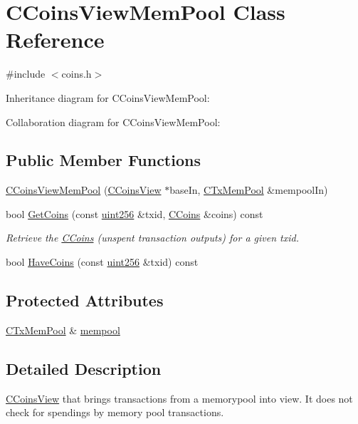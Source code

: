 \hypertarget{class_c_coins_view_mem_pool}{}\section{C\+Coins\+View\+Mem\+Pool Class Reference}
\label{class_c_coins_view_mem_pool}


{\ttfamily \#include $<$coins.\+h$>$}



Inheritance diagram for C\+Coins\+View\+Mem\+Pool\+:


Collaboration diagram for C\+Coins\+View\+Mem\+Pool\+:
\subsection*{Public Member Functions}
\begin{DoxyCompactItemize}
\item 
\hyperlink{class_c_coins_view_mem_pool_aab9a206c304acec322fddf646c7bafb9}{C\+Coins\+View\+Mem\+Pool} (\hyperlink{class_c_coins_view}{C\+Coins\+View} $\ast$base\+In, \hyperlink{class_c_tx_mem_pool}{C\+Tx\+Mem\+Pool} \&mempool\+In)
\item 
bool \hyperlink{class_c_coins_view_mem_pool_a01564f29ff2673ddd0d27414e576f1bc}{Get\+Coins} (const \hyperlink{classuint256}{uint256} \&txid, \hyperlink{class_c_coins}{C\+Coins} \&coins) const 
\begin{DoxyCompactList}\small\item\em Retrieve the \hyperlink{class_c_coins}{C\+Coins} (unspent transaction outputs) for a given txid. \end{DoxyCompactList}\item 
bool \hyperlink{class_c_coins_view_mem_pool_a965e6c8e378fe937620ba2c180d1ed74}{Have\+Coins} (const \hyperlink{classuint256}{uint256} \&txid) const 
\end{DoxyCompactItemize}
\subsection*{Protected Attributes}
\begin{DoxyCompactItemize}
\item 
\hyperlink{class_c_tx_mem_pool}{C\+Tx\+Mem\+Pool} \& \hyperlink{class_c_coins_view_mem_pool_a7a3870fc65376cb311a0b3abb28fec10}{mempool}
\end{DoxyCompactItemize}


\subsection{Detailed Description}
\hyperlink{class_c_coins_view}{C\+Coins\+View} that brings transactions from a memorypool into view. It does not check for spendings by memory pool transactions. 

